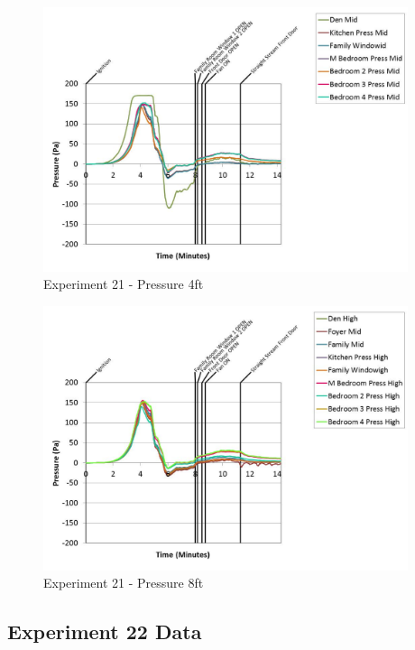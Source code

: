 \documentclass{article}
\begin{document}
\begin{appendices}
	\begin{figure}[h!]
		\centering
		\includegraphics[height=3.05in]{0_Images/Results_Charts/Exp_21_Charts/Pressure4ft.pdf}
		\caption{Experiment 21 - Pressure 4ft}
	\end{figure}
 
	\clearpage

	\begin{figure}[h!]
		\centering
		\includegraphics[height=3.05in]{0_Images/Results_Charts/Exp_21_Charts/Pressure8ft.pdf}
		\caption{Experiment 21 - Pressure 8ft}
	\end{figure}
 

		\clearpage
\clearpage		\large
\subsection{Experiment 22 Data} \label{App:Exp22Results} 


\end{appendices}
\end{document}

